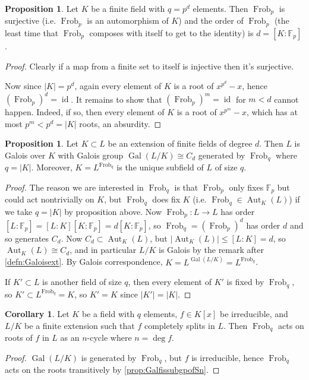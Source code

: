 \documentclass{article}
\newcommand{\F}{\mathbb{F}}
\newcommand{\Aut}{\operatorname{Aut}}
\newcommand{\id}{\operatorname{id}}
\newcommand{\Gal}{\operatorname{Gal}}
\newcommand{\Frob}{\operatorname{Frob}}
\theoremstyle{definition}
\newtheorem{prop}[defn]{Proposition}
\newtheorem{coro}[defn]{Corollary}
\begin{document}
\begin{prop}
Let $K$ be a finite field with $q=p^d$ elements. Then $\Frob_p$ is surjective (i.e. $\Frob_p$ is an automorphism of $K$) and the order of $\Frob_p$ (the least time that $\Frob_p$ composes with itself to get to the identity) is $d=[K:\F_p]$.
\end{prop}
\begin{proof}
Clearly if a map from a finite set to itself is injective then it's surjective.

Now since $|K|=p^d$, again every element of $K$ is a root of $x^{p^d}-x$, hence $(\Frob_p)^d=\id$. It remains to show that $(\Frob_p)^m=\id$ for $m<d$ cannot happen. Indeed, if so, then every element of $K$ is a root of $x^{p^m}-x$, which has at most $p^m<p^d=|K|$ roots, an absurdity.
\end{proof}

\begin{prop}
Let $K\subset L$ be an extension of finite fields of degree $d$. Then $L$ is Galois over $K$ with Galois group $\Gal(L/K)\cong C_d$ generated by $\Frob_q$ where $q=|K|$. Moreover, $K=L^{\Frob_q}$ is the unique subfield of $L$ of size $q$.
\end{prop}
\begin{proof}
The reason we are interested in $\Frob_q$ is that $\Frob_p$ only fixes $\F_p$ but could act nontrivially on $K$, but $\Frob_q$ does fix $K$ (i.e. $\Frob_q\in\Aut_K(L)$) if we take $q=|K|$ by proposition above. Now $\Frob_p:L\rightarrow L$ has order $[L:\F_p]=[L:K][K:\F_p]=d[K:\F_p]$, so $\Frob_q=(\Frob_p)^d$ has order $d$ and so generates $C_d$. Now $C_d\subset\Aut_K(L)$, but $|\!\Aut_K(L)|\leq [L:K]=d$, so $\Aut_K(L)\cong C_d$, and in particular $L/K$ is Galois by the remark after \ref{defn:Galoisext}. By Galois correspondence, $K=L^{\Gal(L/K)}=L^{\Frob_q}$.

If $K'\subset L$ is another field of size $q$, then every element of $K'$ is fixed by $\Frob_q$, so $K'\subset L^{\Frob_q}=K$, so $K'=K$ since $|K'|=|K|$.
\end{proof}

\begin{coro}
Let $K$ be a field with $q$ elements, $f\in K[x]$ be irreducible, and $L/K$ be a finite extension such that $f$ completely splits in $L$. Then $\Frob_q$ acts on roots of $f$ in $L$ as an $n$-cycle where $n=\deg f$.
\end{coro}
\begin{proof}
$\Gal(L/K)$ is generated by $\Frob_q$, but $f$ is irreducible, hence $\Frob_q$ acts on the roots transitively by \ref{prop:GalfissubgpofSn}.
\end{proof}
\end{document}

